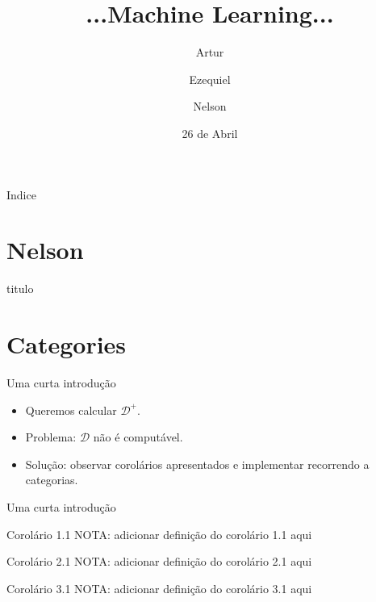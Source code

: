 \documentclass{beamer}
\title
{...Machine Learning...}
\author[Artur, Ezequiel, Nelson] 
{Artur \and Ezequiel \and Nelson}
\institute
{Universidade do Minho}
\date
{26 de Abril}
\begin{document}
\begin{frame}
  \titlepage
\end{frame}

\begin{frame}{Indice}
  \tableofcontents
\end{frame}


\section{Nelson}

\begin{frame}{titulo}
\end{frame}



\section{Categories}

\begin{frame}{Uma curta introdução}
\begin{itemize}
 \item<1-> Queremos calcular $\mathcal{D}^{+}$.
 \item<2-> Problema: $\mathcal{D}$ não é computável.
 \item<3-> Solução: observar corolários apresentados e implementar recorrendo a categorias.
\end{itemize}

\end{frame}



\begin{frame}{Uma curta introdução}

    \begin{block}{Corolário 1.1}
    NOTA: adicionar definição do corolário 1.1 aqui
    \end{block}
    
    \begin{block}{Corolário 2.1}
    NOTA: adicionar definição do corolário 2.1 aqui
    \end{block}
    
    \begin{block}{Corolário 3.1}
    NOTA: adicionar definição do corolário 3.1 aqui
    \end{block}
 
\end{frame}
\end{document}
